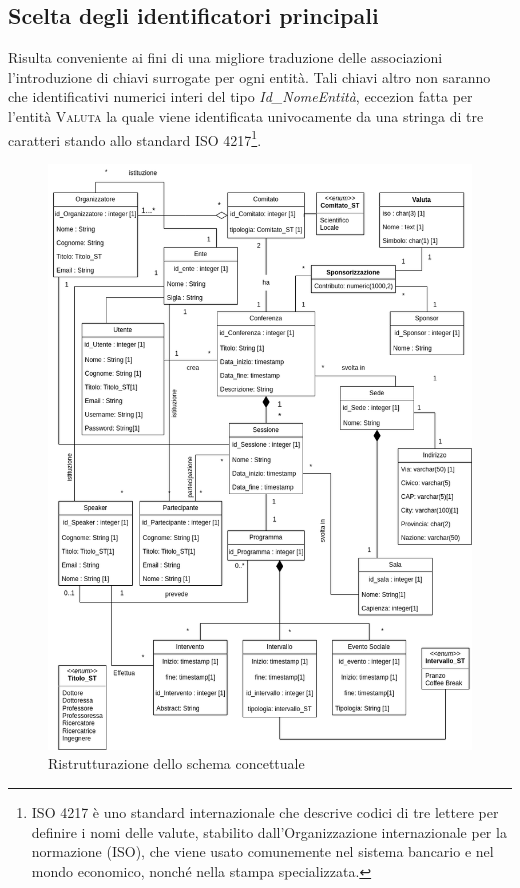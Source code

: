 \subsection{Scelta degli identificatori principali}
Risulta conveniente ai fini di una migliore traduzione delle associazioni l’introduzione di chiavi
surrogate per ogni entità. Tali chiavi altro non saranno che identificativi numerici interi del tipo \textit{Id\_NomeEntità}, eccezion fatta per l'entità \textsc{Valuta} la quale viene identificata univocamente da una stringa di tre caratteri stando allo standard ISO 4217\footnote{ISO 4217 è uno standard internazionale che descrive codici di tre lettere per definire i nomi delle valute, stabilito dall'Organizzazione internazionale per la normazione (ISO), che viene usato comunemente nel sistema bancario e nel mondo economico, nonché nella stampa specializzata.}.
\begin{figure}[h!]
	\centering
	\includegraphics[scale=0.55]{Immagini/Ristrutturato_finale.png}
	\caption{Ristrutturazione dello schema concettuale}\label{uml:schema_ristrutturato}
\end{figure}